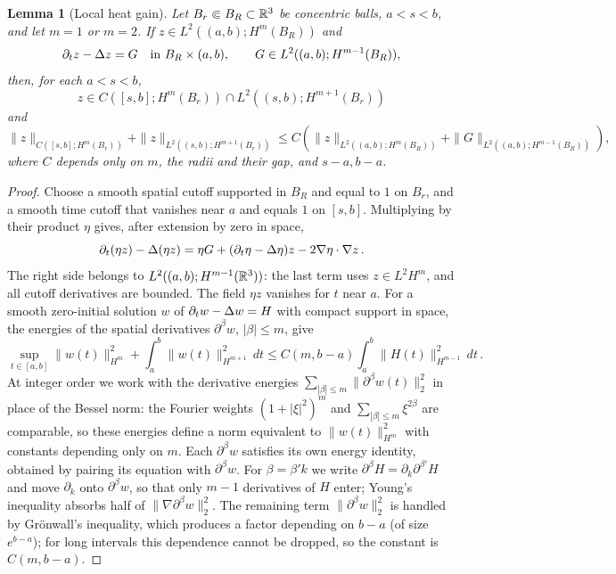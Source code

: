 \documentclass[11pt,letterpaper]{article}
\numberwithin{equation}{section}
\theoremstyle{plain}
\newtheorem{lemma}[theorem]{Lemma}
\theoremstyle{definition}
\theoremstyle{remark}
\begin{document}
\begin{lemma}[Local heat gain]\label{lem:local-heat-gain}
Let $B_r\Subset B_R\subset\mathbb{R}^3$ be concentric balls, $a<s<b$, and let $m=1$ or $m=2$. If $z\in L^2((a,b);H^m(B_R))$ and
\[
 \partial_t z-\Delta z=G\quad\hbox{in }B_R\times(a,b),
 \qquad G\in L^2((a,b);H^{m-1}(B_R)),
\]
then, for each $a<s<b$,
\[
 z\in C([s,b];H^m(B_r))\cap L^2((s,b);H^{m+1}(B_r))
\]
and
\begin{equation}\label{eq:local-heat-gain}
 \|z\|_{C([s,b];H^m(B_r))}+\|z\|_{L^2((s,b);H^{m+1}(B_r))}
 \le C\left(\|z\|_{L^2((a,b);H^m(B_R))}
              +\|G\|_{L^2((a,b);H^{m-1}(B_R))}\right),
\end{equation}
where $C$ depends only on $m$, the radii and their gap, and $s-a,b-a$.
\end{lemma}

\begin{proof}
Choose a smooth spatial cutoff supported in $B_R$ and equal to $1$ on $B_r$, and a smooth time cutoff that vanishes near $a$ and equals $1$ on $[s,b]$. Multiplying by their product $\eta$ gives, after extension by zero in space,
\[
 \partial_t(\eta z)-\Delta(\eta z)
 =\eta G+(\partial_t\eta-\Delta\eta)z-2\nabla\eta\cdot\nabla z\,.
\]
The right side belongs to $L^2((a,b);H^{m-1}(\mathbb{R}^3))$: the last term uses $z\in L^2H^m$, and all cutoff derivatives are bounded. The field $\eta z$ vanishes for $t$ near $a$. For a smooth zero-initial solution $w$ of $\partial_t w-\Delta w=H$ with compact support in space, the energies of the spatial derivatives $\partial^\beta w$, $|\beta|\le m$, give
\[
 \sup_{t\in[a,b]}\|w(t)\|_{H^m}^2+\int_a^b\|w(t)\|_{H^{m+1}}^2\,dt
 \le C(m,b-a)\int_a^b\|H(t)\|_{H^{m-1}}^2\,dt\,.
\]
At integer order we work with the derivative energies $\sum_{|\beta|\le m}\|\partial^\beta w(t)\|_2^2$ in place of the Bessel norm: the Fourier weights $(1+|\xi|^2)^m$ and $\sum_{|\beta|\le m}\xi^{2\beta}$ are comparable, so these energies define a norm equivalent to $\|w(t)\|_{H^m}^2$ with constants depending only on $m$. Each $\partial^\beta w$ satisfies its own energy identity, obtained by pairing its equation with $\partial^\beta w$. For $\beta=\beta'k$ we write $\partial^\beta H=\partial_k\partial^{\beta'}H$ and move $\partial_k$ onto $\partial^\beta w$, so that only $m-1$ derivatives of $H$ enter; Young's inequality absorbs half of $\|\nabla\partial^\beta w\|_2^2$. The remaining term $\|\partial^\beta w\|_2^2$ is handled by Grönwall's inequality, which produces a factor depending on $b-a$ (of size $e^{b-a}$); for long intervals this dependence cannot be dropped, so the constant is $C(m,b-a)$.


\end{proof}
\end{document}

